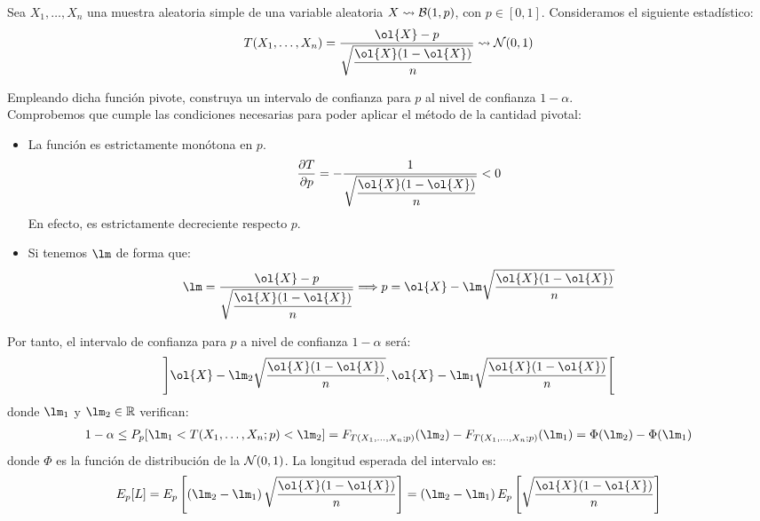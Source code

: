 \begin{ejercicio}[Reto]
    Sea $X_1, \ldots, X_n$ una muestra aleatoria simple de una variable aleatoria $X\rightsquigarrow\mathcal{B}(1,p)$, con $p\in [0,1]$. Consideramos el siguiente estadístico:
    \begin{align*}
        T(X_1, \ldots, X_n) = \dfrac{\ol{X} - p}{\sqrt{\dfrac{\ol{X}(1-\ol{X})}{n}}} \rightsquigarrow \cc{N}(0,1)
    \end{align*}

    Empleando dicha función pivote, construya un intervalo de confianza para $p$ al nivel de confianza $1 - \alpha$.\\

    Comprobemos que cumple las condiciones necesarias para poder aplicar el método de la cantidad pivotal:
    \begin{itemize}
        \item La función es estrictamente monótona en $p$.
        \begin{align*}
            \frac{\partial T}{\partial p} = -\frac{1}{\sqrt{\dfrac{\ol{X}(1-\ol{X})}{n}}} < 0
        \end{align*}
        En efecto, es estrictamente decreciente respecto $p$.
        \item Si tenemos $\lm$ de forma que:
            \begin{align*}
                \lm = \dfrac{\ol{X} - p}{\sqrt{\dfrac{\ol{X}(1-\ol{X})}{n}}} \Longrightarrow p = \ol{X} - \lm\sqrt{\dfrac{\ol{X}(1-\ol{X})}{n}}
            \end{align*}
    \end{itemize}

    Por tanto, el intervalo de confianza para $p$ a nivel de confianza $1-\alpha$ será:
    \begin{align*}
        \left]\ol{X} - \lm_2\sqrt{\dfrac{\ol{X}(1-\ol{X})}{n}},\ol{X} - \lm_1\sqrt{\dfrac{\ol{X}(1-\ol{X})}{n}}\right[
    \end{align*}
    donde $\lm_1$ y $\lm_2\in \bb{R}$ verifican:
    \begin{align*}
        1-\alpha\leq P_p[\lm_1<T(X_1, \ldots, X_n;p)<\lm_2] = F_{T(X_1, \ldots, X_n;p)}(\lm_2) - F_{T(X_1, \ldots, X_n;p)}(\lm_1) = \Phi(\lm_2) - \Phi(\lm_1)
    \end{align*}
    donde $\Phi$ es la función de distribución de la $\mathcal{N}(0,1)$. La longitud esperada del intervalo es:
    \begin{align*}
        E_p[L] = E_p\left[\left(\lm_2 - \lm_1\right)\sqrt{\dfrac{\ol{X}(1-\ol{X})}{n}}\right] = \left(\lm_2 - \lm_1\right)E_p\left[\sqrt{\dfrac{\ol{X}(1-\ol{X})}{n}}\right]
    \end{align*}


\end{ejercicio}

